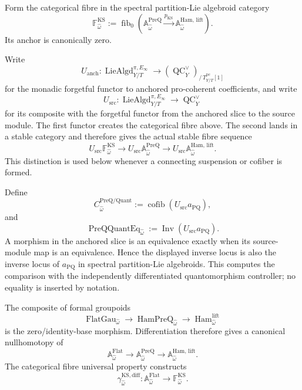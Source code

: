 \begin{definition}
\label{def:prequantum-intrinsic-differentiated-ks-fibre}
Form the categorical fibre in the spectral partition-Lie algebroid category
\[
\boxed{
\mathbb F_{\widehat\omega}^{\mathrm{KS}}
:=
\operatorname{fib}_{0}
\left(
\mathbb A_{\widehat\omega}^{\mathrm{PreQ}}
\xrightarrow{p_{\mathrm{KS}}}
\mathbb A_{\widehat\omega}^{\mathrm{Ham,\,lift}}
\right).
}
\]
Its anchor is canonically zero.
\end{definition}

Write
\[
U_{\mathrm{anch}}:
\operatorname{LieAlgd}^{\pi,E_\infty}_{Y/T}
\longrightarrow
(\operatorname{QC}^{\vee}_Y)_{/\,T^{\mathrm{pc}}_{Y/T}[1]}
\]
for the monadic forgetful functor to anchored pro-coherent coefficients, and write
\[
U_{\mathrm{src}}:
\operatorname{LieAlgd}^{\pi,E_\infty}_{Y/T}
\longrightarrow
\operatorname{QC}^{\vee}_Y
\]
for its composite with the forgetful functor from the anchored slice to the
source module.  The first functor creates the categorical fibre above.  The
second lands in a stable category and therefore gives the actual stable fibre
sequence
\[
\boxed{
U_{\mathrm{src}}\mathbb F_{\widehat\omega}^{\mathrm{KS}}
\longrightarrow
U_{\mathrm{src}}\mathbb A_{\widehat\omega}^{\mathrm{PreQ}}
\longrightarrow
U_{\mathrm{src}}\mathbb A_{\widehat\omega}^{\mathrm{Ham,\,lift}}.
}
\]
This distinction is used below whenever a connecting suspension or cofiber is
formed.

\begin{definition}
\label{def:prequantum-quantomorphism-controller-discrepancy}
Define
\[
\boxed{
C_{\widehat\omega}^{\mathrm{PreQ/Quant}}
:=
\operatorname{cofib}
\left(U_{\mathrm{src}}a_{\mathrm{PQ}}\right),
}
\]
and
\[
\boxed{
\operatorname{PreQQuantEq}_{\widehat\omega}
:=
\operatorname{Inv}
\left(U_{\mathrm{src}}a_{\mathrm{PQ}}\right).
}
\]
A morphism in the anchored slice is an equivalence exactly when its source-module
map is an equivalence.  Hence the displayed inverse locus is also the inverse
locus of $a_{\mathrm{PQ}}$ in spectral partition-Lie algebroids.  This computes
the comparison with the independently differentiated quantomorphism controller;
no equality is inserted by notation.
\end{definition}

\begin{construction}
\label{constr:prequantum-differentiated-flat-ks-comparison}
The composite of formal groupoids
\[
\operatorname{FlatGau}_{\widehat\omega}
\longrightarrow
\operatorname{HamPreQ}_{\widehat\omega}
\longrightarrow
\operatorname{Ham}^{\mathrm{lift}}_{\widehat\omega}
\]
is the zero/identity-base morphism.  Differentiation therefore gives a canonical
nullhomotopy of
\[
\mathbb A_{\widehat\omega}^{\mathrm{Flat}}
\longrightarrow
\mathbb A_{\widehat\omega}^{\mathrm{PreQ}}
\longrightarrow
\mathbb A_{\widehat\omega}^{\mathrm{Ham,\,lift}}.
\]
The categorical fibre universal property constructs
\[
\boxed{
\gamma_{\widehat\omega}^{\mathrm{KS,diff}}:
\mathbb A_{\widehat\omega}^{\mathrm{Flat}}
\longrightarrow
\mathbb F_{\widehat\omega}^{\mathrm{KS}}.
}
\]
\end{construction}

